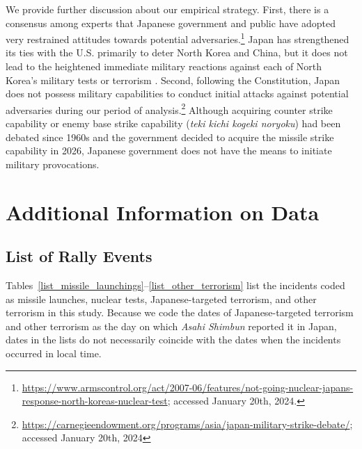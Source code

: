 \documentclass[12pt,letterpaper]{scrartcl}
\let\oldfootnote\footnote
\renewcommand\footnote[1]{\oldfootnote{\hspace{2mm}#1}}
\begin{document}
We provide further discussion about our empirical strategy. First, there is a consensus among experts that Japanese government and public have adopted very restrained attitudes towards potential adversaries.\footnote{\href{https://www.armscontrol.org/act/2007-06/features/not-going-nuclear-japans-response-north-koreas-nuclear-test}{https://www.armscontrol.org/act/2007-06/features/not-going-nuclear-japans-response-north-koreas-nuclear-test}; accessed January 20th, 2024.} Japan has strengthened its ties with the U.S. primarily to deter North Korea and China, but it does not lead to the heightened immediate military reactions against each of North Korea's military tests or terrorism \citep{izumi2007,izumikawa2017}. Second, following the Constitution, Japan does not possess military capabilities to conduct initial attacks against potential adversaries during our period of analysis.\footnote{\url{https://carnegieendowment.org/programs/asia/japan-military-strike-debate/}; accessed January 20th, 2024} Although acquiring counter strike capability or enemy base strike capability (\textit{teki kichi kogeki noryoku}) had been debated since 1960s and the government decided to acquire the missile strike capability in 2026, Japanese government does not have the means to initiate military provocations.

\section{Additional Information on Data}\label{app:sec:data}


\subsection{List of Rally Events}\label{app:subsec:events}


Tables~\ref{list_missile_launchings}--\ref{list_other_terrorism} list the incidents coded as missile launches, nuclear tests, Japanese-targeted terrorism, and other terrorism in this study. Because we code the dates of Japanese-targeted terrorism and other terrorism as the day on which \emph{Asahi Shimbun} reported it in Japan, dates in the lists do not necessarily coincide with the dates when the incidents occurred in local time.
\end{document}
